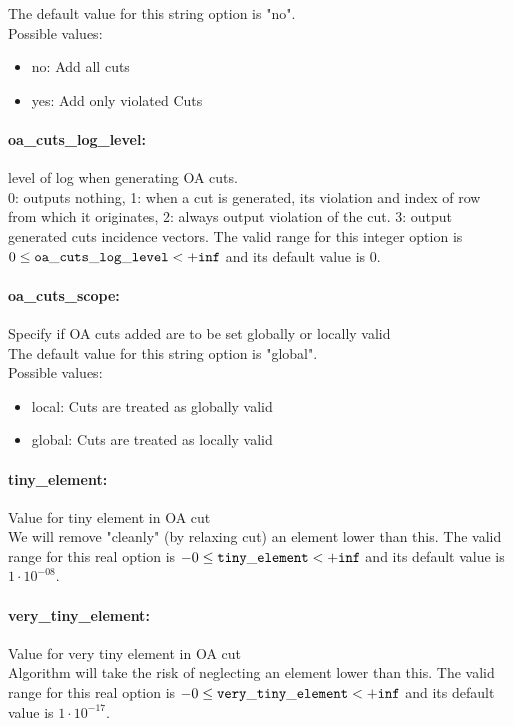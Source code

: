 The default value for this string option is "no".
\\ 
Possible values:
\begin{itemize}
   \item no: Add all cuts
   \item yes: Add only violated Cuts
\end{itemize}

\paragraph{oa\_cuts\_log\_level:}\label{sec:oa_cuts_log_level} level of log when generating OA cuts. $\;$ \\
 0: outputs nothing,
1: when a cut is generated,
its violation and index of row from which it
originates,
2: always output violation of the
cut.
3: output generated cuts incidence vectors. The valid range for this integer option is
$0 \le {\tt oa\_cuts\_log\_level } <  {\tt +inf}$
and its default value is $0$.


\paragraph{oa\_cuts\_scope:}\label{sec:oa_cuts_scope} Specify if OA cuts added are to be set globally or locally valid $\;$ \\

The default value for this string option is "global".
\\ 
Possible values:
\begin{itemize}
   \item local: Cuts are treated as globally valid
   \item global: Cuts are treated as locally valid
\end{itemize}

\paragraph{tiny\_element:}\label{sec:tiny_element} Value for tiny element in OA cut $\;$ \\
 We will remove "cleanly" (by relaxing cut) an
element lower than this. The valid range for this real option is 
$-0 \le {\tt tiny\_element } <  {\tt +inf}$
and its default value is $1 \cdot 10^{-08}$.


\paragraph{very\_tiny\_element:}\label{sec:very_tiny_element} Value for very tiny element in OA cut $\;$ \\
 Algorithm will take the risk of neglecting an
element lower than this. The valid range for this real option is 
$-0 \le {\tt very\_tiny\_element } <  {\tt +inf}$
and its default value is $1 \cdot 10^{-17}$.


